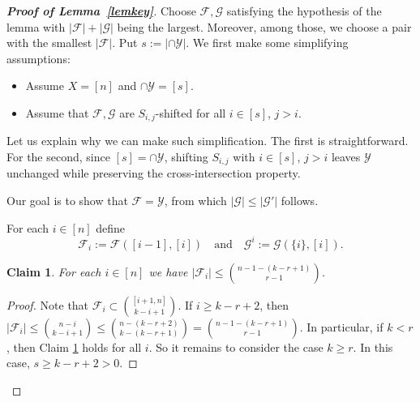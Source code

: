 \documentclass[11pt]{article}
\def\marrow{{\boldmath {\marginpar[\hfill$\rightarrow \rightarrow$]{$\leftarrow \leftarrow$}}}}
\def\andrey#1{{\sc Andrey: }{\marrow\sf \textcolor{blue}{#1}}}
\newcommand{\m}{\mathcal}
\newtheorem{claim}[theorem]{Claim}
\begin{document}
\begin{proof}[{\bf Proof of Lemma~\ref{lemkey}}]
Choose $\m F, \m G$ satisfying the hypothesis of the lemma with $|\m F|+|\m G|$ being the largest. Moreover, among those, we choose a pair with the smallest  $|\m F|$. Put $s:=|\cap \m Y|$.
We first make some simplifying assumptions:
\begin{itemize}
\item Assume $X = [n]$ and $\cap \m Y=[s]$. 
\item Assume that $\mathcal{F},\mathcal{G}$ are $S_{i,j}$-shifted for all $i\in[s]$, $j>i$. 
\end{itemize}


Let us explain why we can make such simplification. 
The first is straightforward.
For the second, since $[s]=\cap \m Y$, shifting $S_{i,j}$ with $i\in [s]$, $j>i$ leaves $\m Y$ unchanged while preserving the cross-intersection property.


Our goal is to show that $\m F=\m Y$, from which $|\m G|\le |\m G'|$ follows.  

For each $i\in [n]$ define 
\[
    \m F_i:=\m F([i-1],[i]) \quad \text{and} \quad \m G^i:=\m G(\{i\},[i]).
\]



\begin{claim}\label{1-8-1}
For each $i\in [n]$ we have $ |\mathcal{F}_i|\le {n-1-(k-r+1)\choose r-1}$.
\end{claim}

\begin{proof}
Note that $\m F_i\subset {[i+1,n]\choose k-i+1}$.
If $i\ge k-r+2$, then 
$|\m F_i|\le {n-i\choose k-i+1}\le {n-(k-r+2)\choose k-(k-r+1)}={n-1-(k-r+1)\choose r-1}$. 
In particular, if $k<r$, then Claim \ref{1-8-1} holds for all $i$. So it remains to consider the case $k\ge r$. In this case, $s\ge k-r+2>0$.


\end{proof}
\end{proof}
\end{document}
